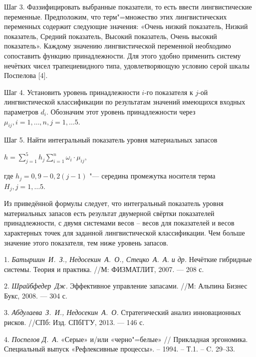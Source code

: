 Шаг 3.
Фаззифицировать выбранные показатели, то есть ввести лингвистические переменные.
Предположим, что терм"=множество этих лингвистических переменных содержит следующие значения: «Очень низкий показатель, Низкий показатель, Средний показатель, Высокий показатель, Очень высокий показатель». Каждому значению лингвистической переменной необходимо сопоставить функцию принадлежности. Для этого удобно применить систему нечётких чисел трапециевидного типа, удовлетворяющую условию серой шкалы Поспелова [4].

Шаг 4.
Установить уровень принадлежности $i$-го показателя к $j$-ой лингвистической классификации по результатам значений имеющихся входных параметров $d_{i}$. Обозначим этот уровень принадлежности через $\mu_{ij}, i = 1, \ldots, n,  j = 1, \ldots 5$.

Шаг 5.
Найти интегральный показатель уровня материальных запасов
\begin{center}
$ h = \sum_{j = 1}^{5} h_{j} \sum_{i = 1}^{n} \omega_{i} \cdot \mu_{ij},$
\end{center}
где $h_{j} = 0,9 - 0,2(j - 1)$ "--- середина промежутка носителя терма $H_{j}, j = 1, \ldots 5$.

Из приведённой формулы следует, что  интегральный показатель уровня материальных запасов есть результат двумерной свёртки показателей принадлежности, с двумя системами весов – весов для показателей и весов характерных точек для заданной  лингвистической классификации. Чем больше значение этого показателя, тем ниже уровень запасов.



\litlist

1. {\it Батыршин~И.~З., Недосекин~А.~О., Стецко~А.~А. и др.} Нечёткие гибридные системы. Теория и
практика. //М: ФИЗМАТЛИТ, 2007. — 208 с.

2. {\it Шрайбфедер~Дж.} Эффективное управление запасами. //М: Альпина Бизнес Букс, 2008. — 304 с.

3. {\it Абдулаева~З.~И., Недосекин~А.~О.} Стратегический анализ инновационных рисков. //СПб: Изд. СПбГГУ, 2013. — 146 с.

4. {\it Поспелов Д.~А.} «Серые» и/или «черно"=белые» // Прикладная эргономика. Специальный выпуск  «Рефлексивные процессы». – 1994. – Т.1. – C. 29–33.
